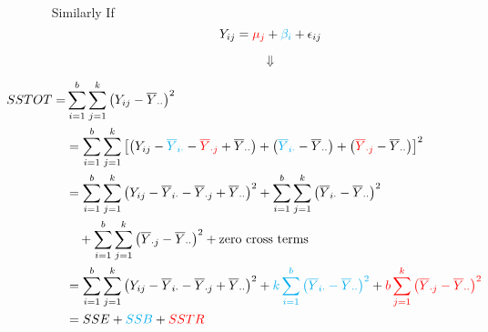 \begin{frame}[fragile]
	\begin{enumerate}
		\item[Similarly] If
			\[
				Y_{ij} = \textcolor{red}{\mu_j} + \textcolor{cyan}{\beta_i} + \epsilon_{ij}
			\]
		\item[]
			\[\Downarrow\]
		\item[]
	\begin{align*}
		\hspace{-4em}SSTOT =  & \sum_{i=1}^b\sum_{j=1}^k \left(Y_{ij}-\overline{Y}_{\cdot\cdot} \right)^2 \\
                          & =  \sum_{i=1}^b\sum_{j=1}^k\left[ \left(Y_{ij}-\textcolor{cyan}{\overline{Y}_{i\cdot}} - \textcolor{red}{\overline{Y}_{\cdot j}}+\overline{Y}_{\cdot\cdot} \right)+\left(\textcolor{cyan}{\overline{Y}_{i\cdot}} - \overline{Y}_{\cdot\cdot}\right)+\left(\textcolor{red}{\overline{Y}_{\cdot j}}- \overline{Y}_{\cdot\cdot}\right)\right]^2 \\
													& =  \sum_{i=1}^b\sum_{j=1}^k\left(Y_{ij}-\overline{Y}_{i\cdot} -\overline{Y}_{\cdot j}+\overline{Y}_{\cdot\cdot}\right)^2 +\sum_{i=1}^b\sum_{j=1}^k\left(\overline{Y}_{i\cdot} - \overline{Y}_{\cdot\cdot}\right)^2 \\
													&\quad+\sum_{i=1}^b\sum_{j=1}^k\left(\overline{Y}_{\cdot j} - \overline{Y}_{\cdot\cdot}\right)^2 + \text{zero cross terms} \\
													& =  \sum_{i=1}^b\sum_{j=1}^k\left(Y_{ij}-\overline{Y}_{i\cdot} -\overline{Y}_{\cdot j} + \overline{Y}_{\cdot\cdot} \right)^2+\textcolor{cyan}{k\sum_{i=1}^b\left(\overline{Y}_{i\cdot} - \overline{Y}_{\cdot\cdot}\right)^2} +\textcolor{red}{b\sum_{j=1}^k\left(\overline{Y}_{\cdot j} - \overline{Y}_{\cdot\cdot}\right)^2} \\
													&= SSE + \textcolor{cyan}{SSB} + \textcolor{red}{SSTR}
	\end{align*}
	\end{enumerate}
\end{frame}
